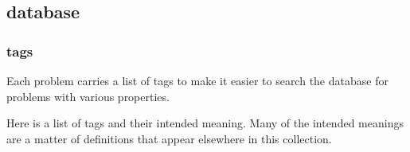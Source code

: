 %
%
%
%
%
%

\subsection{database}

\subsubsection{tags}

Each problem carries a list of tags to make it easier to search the database for
problems with various properties.

Here is a list of tags and their intended meaning. Many of the intended meanings are a matter
of definitions that appear elsewhere in this collection.

\newenvironment{taglist}{}{}

